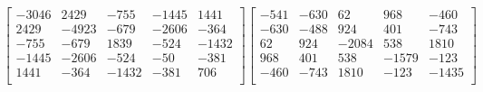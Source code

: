 \documentclass[12pt]{amsart}
\theoremstyle{plain}
\theoremstyle{definition}
\begin{document}
\begin{landscape}
\begin{align*}
\begin{bmatrix}
-3046  &   2429  &   -755  &   -1445  &   1441  \\ 
 2429  &   -4923  &   -679  &   -2606  &   -364  \\ 
 -755  &   -679  &   1839  &   -524  &   -1432  \\ 
 -1445  &   -2606  &   -524  &   -50  &   -381  \\ 
 1441  &   -364  &   -1432  &   -381  &   706  \\ 
\end{bmatrix}
\begin{bmatrix}
-541  &   -630  &   62  &   968  &   -460  \\ 
 -630  &   -488  &   924  &   401  &   -743  \\ 
 62  &   924  &   -2084  &   538  &   1810  \\ 
 968  &   401  &   538  &   -1579  &   -123  \\ 
 -460  &   -743  &   1810  &   -123  &   -1435  \\ 
\end{bmatrix}
\\
\end{align*} 
\end{landscape}


\end{document}

